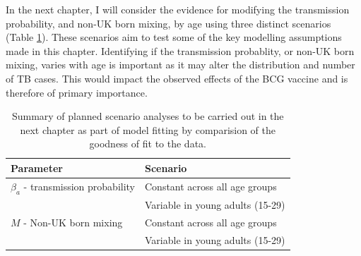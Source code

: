 \documentclass[11pt,twoside]{bristolthesis}
\begin{document}
  In the next chapter, I will consider the evidence for modifying the transmission probability, and non-UK born mixing, by age using three distinct scenarios (Table \ref{tab:summary-scenarios}). These scenarios aim to test some of the key modelling assumptions made in this chapter. Identifying if the transmission probablity, or non-UK born mixing, varies with age is important as it may alter the distribution and number of TB cases. This would impact the observed effects of the BCG vaccine and is therefore of primary importance.
  \begin{table}[t]
  
  \caption{\label{tab:summary-scenarios}Summary of planned scenario analyses to be carried out in the next chapter as part of model fitting by comparision of the goodness of fit to the data.}
  \centering
  \begin{tabular}{>{\raggedright\arraybackslash}p{4cm}>{\raggedright\arraybackslash}p{8cm}}
  \toprule
  Parameter & Scenario\\
  \midrule
  $\beta_a$ - transmission probability & Constant across all age groups\\
   & Variable in young adults (15-29)\\
  $M$ - Non-UK born mixing & Constant across all age groups\\
   & Variable in young adults (15-29)\\
  \bottomrule
  \end{tabular}
  \end{table}
\end{document}
